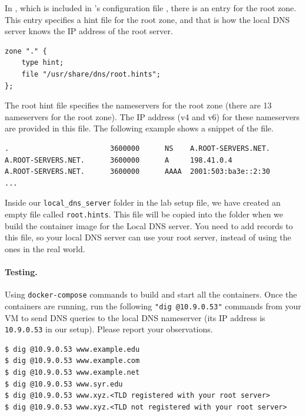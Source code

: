 In , which is included 
in \bind's configuration file , there is an 
entry for the root zone. This entry specifies a hint file for the
root zone, and that is how the local DNS server knows the IP address of the
root server. 


\begin{lstlisting}
zone "." {
	type hint;
	file "/usr/share/dns/root.hints";
};
\end{lstlisting}
 
The root hint file specifies the nameservers for the 
root zone (there are 13 nameservers for the root zone). The 
IP address (v4 and v6) for these nameservers are provided in this file. 
The following example shows a snippet of the file. 


\begin{lstlisting}
.                        3600000      NS    A.ROOT-SERVERS.NET.
A.ROOT-SERVERS.NET.      3600000      A     198.41.0.4
A.ROOT-SERVERS.NET.      3600000      AAAA  2001:503:ba3e::2:30
...
\end{lstlisting}

Inside our \texttt{local\_dns\_server} folder in the lab setup file,
we have created an empty file called \texttt{root.hints}. This file 
will be copied into the  folder when
we build the container image for the Local DNS server. 
You need to add records to this file, so your local DNS server 
can use your root server, instead of using the ones in the real world.



\paragraph{Testing.} Using \texttt{docker-compose} commands
to build and start all the containers.
Once the containers are running,
run the following \texttt{"dig @10.9.0.53"} commands from your VM to
send DNS queries to the local DNS nameserver (its IP address
is \texttt{10.9.0.53} in our setup). 
Please report your observations.

\begin{lstlisting}
$ dig @10.9.0.53 www.example.edu
$ dig @10.9.0.53 www.example.com
$ dig @10.9.0.53 www.example.net
$ dig @10.9.0.53 www.syr.edu
$ dig @10.9.0.53 www.xyz.<TLD registered with your root server>
$ dig @10.9.0.53 www.xyz.<TLD not registered with your root server>
\end{lstlisting}



